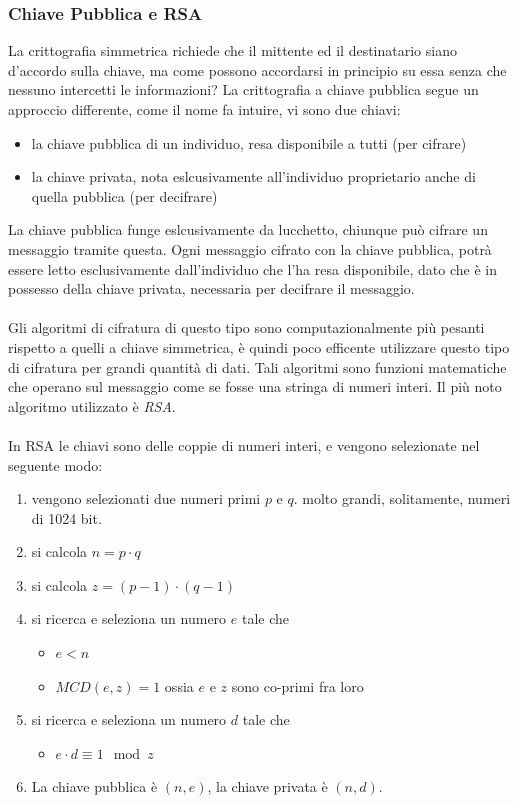 \documentclass[12pt, letterpaper]{article}
\newcommand{\acc}{\\\hphantom{}\\}
\begin{document}
\subsubsection{Chiave Pubblica e RSA}
La crittografia simmetrica richiede che il mittente ed il destinatario siano d'accordo sulla chiave, ma come possono 
accordarsi in principio su essa senza che nessuno intercetti le informazioni? La crittografia a chiave pubblica segue 
un approccio differente, come il nome fa intuire, vi sono due chiavi:\begin{itemize}
    \item la chiave pubblica di un individuo, resa disponibile a tutti (per cifrare)
    \item la chiave privata, nota eslcusivamente all'individuo proprietario anche di quella pubblica  (per decifrare)
\end{itemize}
La chiave pubblica funge eslcusivamente da lucchetto, chiunque può cifrare un messaggio tramite questa. Ogni messaggio 
cifrato con la chiave pubblica, potrà essere letto esclusivamente dall'individuo che l'ha resa disponibile, dato che 
è in possesso della chiave privata, necessaria per decifrare il messaggio. \acc 
Gli algoritmi di cifratura di questo tipo sono computazionalmente più pesanti rispetto a quelli a chiave simmetrica, 
è quindi poco efficente utilizzare questo tipo di cifratura per grandi quantità di dati. Tali algoritmi sono funzioni 
matematiche che operano sul messaggio come se fosse una stringa di numeri interi. Il più noto algoritmo 
utilizzato è \textit{RSA}.\acc 
In RSA le chiavi sono delle coppie di numeri interi, e vengono selezionate nel seguente modo:\begin{enumerate}
    \item vengono selezionati due numeri primi $p$ e $q$. molto grandi, solitamente, numeri di 1024 bit. 
    \item si calcola $n=p\cdot q$ \item si calcola $z=(p-1)\cdot(q-1)$
    \item si ricerca e seleziona un numero $e$ tale che \begin{itemize}
        \item $e<n$
        \item $MCD(e,z)=1$ ossia $e$ e $z$ sono co-primi fra loro
    \end{itemize}
    \item si ricerca e seleziona un numero $d$ tale che\begin{itemize}
        \item $e\cdot d \equiv 1 \mod{z}$
    \end{itemize}
    \item La chiave pubblica è $(n,e)$, la chiave privata è $(n,d)$.
\end{enumerate}
\end{document}
